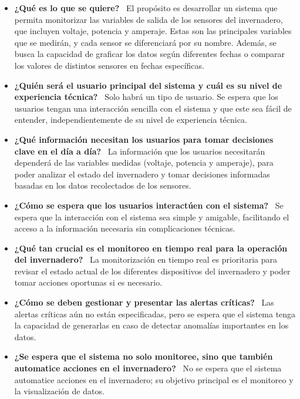 \begin{itemize} 
    \item \textbf{¿Qué es lo que se quiere?} \ El propósito es desarrollar un sistema que permita monitorizar las variables de salida de los sensores del invernadero, que incluyen voltaje, potencia y amperaje. Estas son las principales variables que se medirán, y cada sensor se diferenciará por su nombre. Además, se busca la capacidad de graficar los datos según diferentes fechas o comparar los valores de distintos sensores en fechas específicas.

    \item \textbf{¿Quién será el usuario principal del sistema y cuál es su nivel de experiencia técnica?} \ Solo habrá un tipo de usuario. Se espera que los usuarios tengan una interacción sencilla con el sistema y que este sea fácil de entender, independientemente de su nivel de experiencia técnica.

    \item \textbf{¿Qué información necesitan los usuarios para tomar decisiones clave en el día a día?} \ La información que los usuarios necesitarán dependerá de las variables medidas (voltaje, potencia y amperaje), para poder analizar el estado del invernadero y tomar decisiones informadas basadas en los datos recolectados de los sensores.

    \item \textbf{¿Cómo se espera que los usuarios interactúen con el sistema?} \ Se espera que la interacción con el sistema sea simple y amigable, facilitando el acceso a la información necesaria sin complicaciones técnicas.

    \item \textbf{¿Qué tan crucial es el monitoreo en tiempo real para la operación del invernadero?} \ La monitorización en tiempo real es prioritaria para revisar el estado actual de los diferentes dispositivos del invernadero y poder tomar acciones oportunas si es necesario.

    \item \textbf{¿Cómo se deben gestionar y presentar las alertas críticas?} \ Las alertas críticas aún no están especificadas, pero se espera que el sistema tenga la capacidad de generarlas en caso de detectar anomalías importantes en los datos.

    \item \textbf{¿Se espera que el sistema no solo monitoree, sino que también automatice acciones en el invernadero?} \ No se espera que el sistema automatice acciones en el invernadero; su objetivo principal es el monitoreo y la visualización de datos.


\end{itemize}
